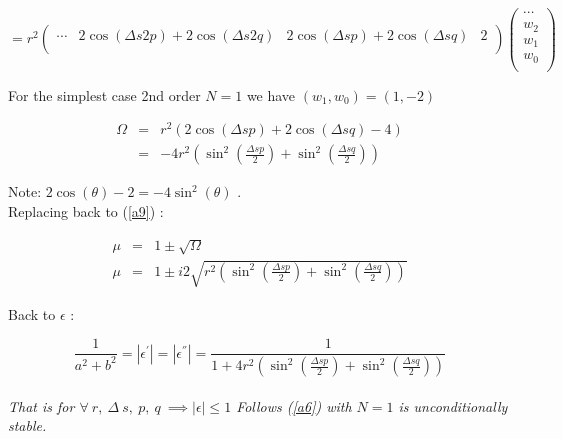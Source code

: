 \documentclass[legalpaper, 12pt]{article}
\begin{document}
\begin{equation}
=r^2
\begin{pmatrix}
 \cdots & 2\cos( \Delta s 2 p) + 2\cos(\Delta s 2 q) & 2\cos(\Delta s p) + 2\cos(\Delta s q) & 2 \\
\end{pmatrix}
\begin{pmatrix}
\cdots \\
w_{2} \\
w_{1} \\
w_0 \\
\end{pmatrix}
\nonumber
\end{equation}

For the simplest case 2nd order $ N=1 $ we have $ (w_1, w_0) = (1, -2) $

\begin{eqnarray}
\Omega	&=& r^2 \left( 2\cos(\Delta s p) + 2\cos(\Delta s q) - 4\right) \nonumber \\
	&=& -4r^2 \left( \sin^2(\frac{\Delta s p}{2}) + \sin^2(\frac{\Delta s q}{2}) \right) \label{a10}
\end{eqnarray}

Note:  $ 2 \cos(\theta) - 2 = -4 \sin ^2 (\theta) $ .\\

Replacing back to (\ref{a9}) :

\begin{eqnarray}
\mu &=& 1 \pm \sqrt{\Omega} \nonumber \\
\mu &=& 1 \pm  i 2 \sqrt{r^2 \left( \sin^2(\frac{\Delta s p}{2}) + \sin^2(\frac{\Delta s q}{2}) \right)} \nonumber
\end{eqnarray}

Back to $\epsilon$ :

$$ \frac{1}{a^2+b^2} = | \epsilon^{'} | = | \epsilon^{''} | = 
\frac{1}{1 + 4r^2 \left( \sin^2(\frac{\Delta s p}{2}) + \sin^2(\frac{\Delta s q}{2}) \right)} $$
\\
\textit{That is for $ \forall \ r, \ \Delta \ s, \ p, \ q \ \implies | \epsilon | \leq 1 $ 
Follows (\ref{a6}) with $N=1$ is unconditionally stable. }
\end{document}
